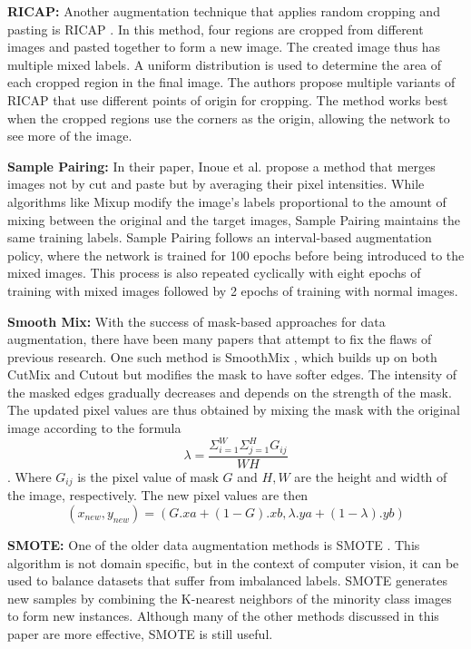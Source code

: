 \textbf{RICAP: }
Another augmentation technique that applies random cropping and pasting is RICAP \cite{takahashiDataAugmentationUsing2020}. In this method, four regions are cropped from different images and pasted together to form a new image. The created image thus has multiple mixed labels. A uniform distribution is used to determine the area of each cropped region in the final image. The authors propose multiple variants of RICAP that use different points of origin for cropping. The method works best when the cropped regions use the corners as the origin, allowing the network to see more of the image.

\textbf{Sample Pairing: }
In their paper, Inoue et al. propose a method that merges images not by cut and paste but by averaging their pixel intensities. While algorithms like Mixup \cite{zhangMixupEmpiricalRisk2018} modify the image's labels proportional to the amount of mixing between the original and the target images, Sample Pairing \cite{inoueDataAugmentationPairing2018} maintains the same training labels. Sample Pairing follows an interval-based augmentation policy, where the network is trained for 100 epochs before being introduced to the mixed images. This process is also repeated cyclically with eight epochs of training with mixed images followed by 2 epochs of training with normal images.

\textbf{Smooth Mix: }
With the success of mask-based approaches for data augmentation, there have been many papers that attempt to fix the flaws of previous research. One such method is SmoothMix \cite{leeSmoothMixSimpleEffective2020}, which builds up on both CutMix \cite{yunCutMixRegularizationStrategy2019} and Cutout \cite{devriesImprovedRegularizationConvolutional2017} but modifies the mask to have softer edges. The intensity of the masked edges gradually decreases and depends on the strength of the mask. The updated pixel values are thus obtained by mixing the mask with the original image according to the formula $$\lambda= \frac{\Sigma_{i=1}^{W}\Sigma_{j=1}^{H}G_{ij}}{WH}$$. Where $G_{ij}$ is the pixel value of mask $G$ and $H, W$ are the height and width of the image, respectively. The new pixel values are then $$(x_{new} , y_{new}) = (G.xa + (1 - G).xb , \lambda.ya + (1 - \lambda).yb)$$

\textbf{SMOTE: }
One of the older data augmentation methods is SMOTE \cite{SMOTESyntheticMinority}. This algorithm is not domain specific, but in the context of computer vision, it can be used to balance datasets that suffer from imbalanced labels. SMOTE generates new samples by combining the K-nearest neighbors of the minority class images to form new instances. Although many of the other methods discussed in this paper are more effective, SMOTE is still useful.

